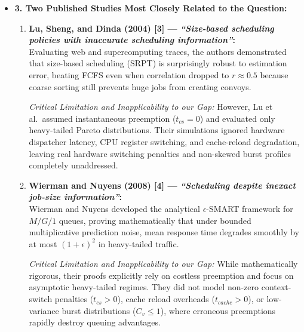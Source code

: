 \documentclass[11pt]{article}
\newcommand{\qLabel}[1]{
    {\fontsize{10.2}{12.2}\selectfont \textbf{#1}}
}
\begin{document}
\newpage
\begin{itemize}[leftmargin=1.2em, itemsep=0.45em, parsep=0pt]

    \item \qLabel{3. Two Published Studies Most Closely Related to the Question:}
    \begin{enumerate}[label=(\alph*), leftmargin=1.2em, itemsep=0.35em, parsep=0pt]
        \item \textbf{Lu, Sheng, and Dinda (2004) [3] --- \textit{``Size-based scheduling policies with inaccurate scheduling information''}:} \\
        Evaluating web and supercomputing traces, the authors demonstrated that size-based scheduling (SRPT) is surprisingly robust to estimation error, beating FCFS even when correlation dropped to $r \approx 0.5$ because coarse sorting still prevents huge jobs from creating convoys. 
        
        \textit{Critical Limitation and Inapplicability to our Gap:} However, Lu et al.\ assumed instantaneous preemption ($t_{cs} = 0$) and evaluated only heavy-tailed Pareto distributions. Their simulations ignored hardware dispatcher latency, CPU register switching, and cache-reload degradation, leaving real hardware switching penalties and non-skewed burst profiles completely unaddressed.

        \item \textbf{Wierman and Nuyens (2008) [4] --- \textit{``Scheduling despite inexact job-size information''}:} \\
        Wierman and Nuyens developed the analytical $\epsilon$-SMART framework for $M/G/1$ queues, proving mathematically that under bounded multiplicative prediction noise, mean response time degrades smoothly by at most $(1+\epsilon)^2$ in heavy-tailed traffic.
        
        \textit{Critical Limitation and Inapplicability to our Gap:} While mathematically rigorous, their proofs explicitly rely on costless preemption and focus on asymptotic heavy-tailed regimes. They did not model non-zero context-switch penalties ($t_{cs} > 0$), cache reload overheads ($t_{cache} > 0$), or low-variance burst distributions ($C_v \le 1$), where erroneous preemptions rapidly destroy queuing advantages.
    \end{enumerate}


\end{itemize}
\end{document}
